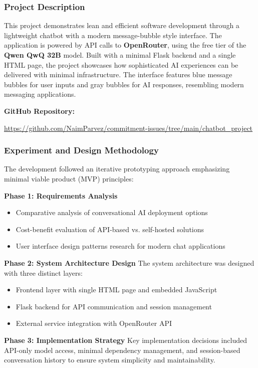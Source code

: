 \documentclass[12pt,a4paper]{article}
\begin{document}
\subsubsection{Project Description}
This project demonstrates lean and efficient software development through a lightweight chatbot with a modern message-bubble style interface. The application is powered by API calls to \textbf{OpenRouter}, using the free tier of the \textbf{Qwen QwQ 32B} model. Built with a minimal Flask backend and a single HTML page, the project showcases how sophisticated AI experiences can be delivered with minimal infrastructure. The interface features blue message bubbles for user inputs and gray bubbles for AI responses, resembling modern messaging applications.

\textbf{GitHub Repository:} \begin{footnotesize}\url{https://github.com/NaimParvez/commitment-issues/tree/main/chatbot_project}\end{footnotesize}

\subsubsection{Experiment and Design Methodology}
The development followed an iterative prototyping approach emphasizing minimal viable product (MVP) principles:

\textbf{Phase 1: Requirements Analysis}
\begin{itemize}
    \item Comparative analysis of conversational AI deployment options
    \item Cost-benefit evaluation of API-based vs. self-hosted solutions
    \item User interface design patterns research for modern chat applications
\end{itemize}

\textbf{Phase 2: System Architecture Design}
The system architecture was designed with three distinct layers:
\begin{itemize}
    \item Frontend layer with single HTML page and embedded JavaScript
    \item Flask backend for API communication and session management
    \item External service integration with OpenRouter API
\end{itemize}

\textbf{Phase 3: Implementation Strategy}
Key implementation decisions included API-only model access, minimal dependency management, and session-based conversation history to ensure system simplicity and maintainability.
\end{document}
